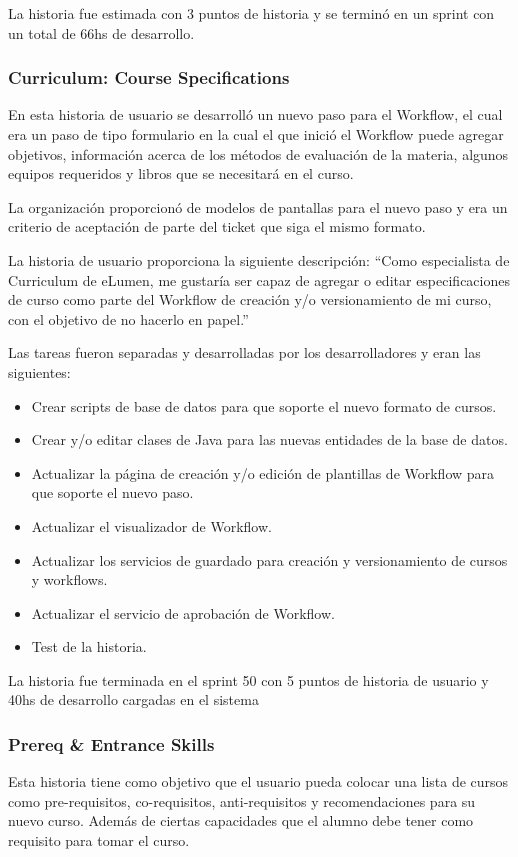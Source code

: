 La historia fue estimada con 3 puntos de historia y se terminó en un sprint con un total de 66hs de desarrollo.

\subsubsection{Curriculum: Course Specifications}
En esta historia de usuario se desarrolló un nuevo paso para el Workflow, el cual era un paso de tipo formulario en la cual el que inició el Workflow puede agregar objetivos, información acerca de los métodos de evaluación de la materia, algunos equipos requeridos y libros que se necesitará en el curso.

La organización proporcionó de modelos de pantallas para el nuevo paso y era un criterio de aceptación de parte del ticket que siga el mismo formato.

La historia de usuario proporciona la siguiente descripción: “Como especialista de Curriculum de eLumen, me gustaría ser capaz de agregar o editar especificaciones de curso como parte del Workflow de creación y/o versionamiento de mi curso, con el objetivo de no hacerlo en papel.”

Las tareas fueron separadas y desarrolladas por los desarrolladores y eran las siguientes:
\begin{itemize}
	\item Crear scripts de base de datos para que soporte el nuevo formato de cursos.
	\item Crear y/o editar clases de Java para las nuevas entidades de la base de datos.
	\item Actualizar la página de creación y/o edición de plantillas de Workflow para que soporte el nuevo paso.
	\item Actualizar el visualizador de Workflow.
	\item Actualizar los servicios de guardado para creación y versionamiento de cursos y workflows.
	\item Actualizar el servicio de aprobación de Workflow.
	\item Test de la historia.
\end{itemize}

La historia fue terminada en el sprint 50 con 5 puntos de historia de usuario y 40hs de desarrollo cargadas en el sistema

\subsubsection{Prereq \& Entrance Skills}
Esta historia tiene como objetivo que el usuario pueda colocar una lista de cursos como pre-requisitos, co-requisitos, anti-requisitos y recomendaciones para su nuevo curso. Además de ciertas capacidades que el alumno debe tener como requisito para tomar el curso.

